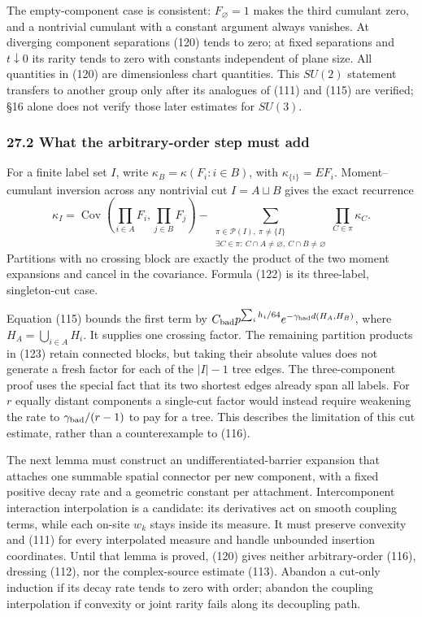 \documentclass[11pt,a4paper]{article}
\begin{document}
The empty-component case is consistent: \(F_\varnothing=1\) makes the
third cumulant zero, and a nontrivial cumulant with a constant argument
always vanishes. At diverging component separations (120) tends to zero;
at fixed separations and \(t\downarrow0\) its rarity tends to zero with
constants independent of plane size. All quantities in (120) are
dimensionless chart quantities. This \(SU(2)\) statement transfers to
another group only after its analogues of (111) and (115) are verified;
§16 alone does not verify those later estimates for \(SU(3)\).

\hypertarget{what-the-arbitrary-order-step-must-add}{%
\subsubsection{27.2 What the arbitrary-order step must
add}\label{what-the-arbitrary-order-step-must-add}}

For a finite label set \(I\), write \(\kappa_B=\kappa(F_i:i\in B)\),
with \(\kappa_{\{i\}}=EF_i\). Moment--cumulant inversion across any
nontrivial cut \(I=A\sqcup B\) gives the exact recurrence
\[\kappa_I=\operatorname{Cov}\left(\prod_{i\in A}F_i,
                                      \prod_{j\in B}F_j\right)
 -\sum_{\substack{\pi\in\mathcal P(I),\ \pi\ne\{I\}\\
            \exists C\in\pi:\ C\cap A\ne\varnothing,\ C\cap B\ne\varnothing}}
       \prod_{C\in\pi}\kappa_C.\tag{123}\] Partitions with no crossing
block are exactly the product of the two moment expansions and cancel in
the covariance. Formula (122) is its three-label, singleton-cut case.

Equation (115) bounds the first term by
\(C_{\rm bad}p^{\sum_i h_i/64}e^{-\gamma_{\rm bad}d(H_A,H_B)}\), where
\(H_A=\bigcup_{i\in A}H_i\). It supplies one crossing factor. The
remaining partition products in (123) retain connected blocks, but
taking their absolute values does not generate a fresh factor for each
of the \(|I|-1\) tree edges. The three-component proof uses the special
fact that its two shortest edges already span all labels. For \(r\)
equally distant components a single-cut factor would instead require
weakening the rate to \(\gamma_{\rm bad}/(r-1)\) to pay for a tree. This
describes the limitation of this cut estimate, rather than a
counterexample to (116).

The next lemma must construct an undifferentiated-barrier expansion that
attaches one summable spatial connector per new component, with a fixed
positive decay rate and a geometric constant per attachment.
Intercomponent interaction interpolation is a candidate: its derivatives
act on smooth coupling terms, while each on-site \(w_k\) stays inside
its measure. It must preserve convexity and (111) for every interpolated
measure and handle unbounded insertion coordinates. Until that lemma is
proved, (120) gives neither arbitrary-order (116), dressing (112), nor
the complex-source estimate (113). Abandon a cut-only induction if its
decay rate tends to zero with order; abandon the coupling interpolation
if convexity or joint rarity fails along its decoupling path.
\end{document}
